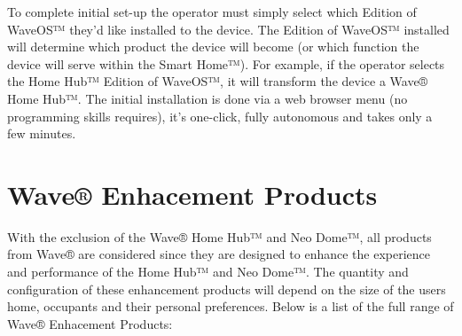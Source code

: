 \documentclass[letterpaper,10pt,english]{sphinxmanual}
\begin{document}
To complete initial set-up the operator must simply select which Edition of WaveOS™ they’d like installed to the device.
The Edition of WaveOS™ installed will determine which product the device will become (or which function the device will serve within the  Smart Home™).
For example, if the operator selects the Home Hub™ Edition of WaveOS™, it will transform the device a Wave® Home Hub™.
The initial installation is done via a web browser menu (no programming skills requires), it’s one-click, fully autonomous and takes only a few minutes.


\section{Wave® Enhacement Products}
\label{\detokenize{introduction:wave-enhacement-products}}
With the exclusion of the Wave® Home Hub™ and Neo Dome™, all products from Wave® are considered  since they are designed to enhance the experience and performance of the Home Hub™ and Neo Dome™. The quantity and configuration of these enhancement products will depend on the size of the users home, occupants and their personal preferences. Below is a list of the full range of Wave® Enhacement Products:
\end{document}
